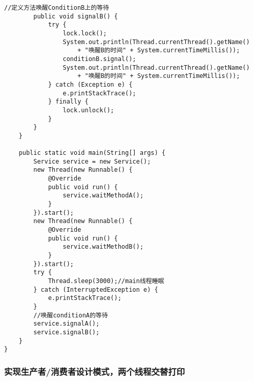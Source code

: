 \documentclass[a4paper]{report}
\begin{document}
\begin{Verbatim}[frame=single,numbersep=5pt,xleftmargin=1.5em,xrightmargin=1.5em]
        //定义方法唤醒ConditionB上的等待
        public void signalB() {
            try {
                lock.lock();
                System.out.println(Thread.currentThread().getName()
                    + "唤醒B的时间" + System.currentTimeMillis());
                conditionB.signal();
                System.out.println(Thread.currentThread().getName()
                    + "唤醒B的时间" + System.currentTimeMillis());
            } catch (Exception e) {
                e.printStackTrace();
            } finally {
                lock.unlock();
            }
        }
    }

    public static void main(String[] args) {
        Service service = new Service();
        new Thread(new Runnable() {
            @Override
            public void run() {
                service.waitMethodA();
            }
        }).start();
        new Thread(new Runnable() {
            @Override
            public void run() {
                service.waitMethodB();
            }
        }).start();
        try {
            Thread.sleep(3000);//main线程睡眠
        } catch (InterruptedException e) {
            e.printStackTrace();
        }
        //唤醒conditionA的等待
        service.signalA();
        service.signalB();
    }
}\end{Verbatim}
\subsubsection{实现生产者/消费者设计模式，两个线程交替打印}
\end{document}
